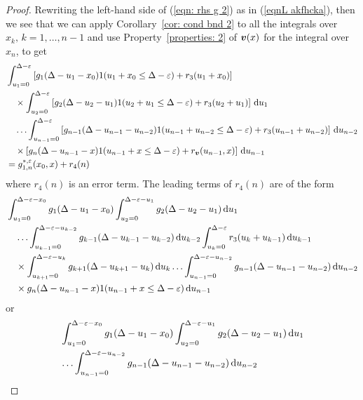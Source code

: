 \begin{proof}
	Rewriting the left-hand side of (\ref{eqn: rhs g 2}) as in (\ref{eqnL akfhcka}), then we see that we can apply Corollary~\ref{cor: cond bnd 2} to all the integrals over \(x_k,\, k=1,\dots,n-1\) and use Property~\ref{properties: 2} of \({\boldsymbol v}(x)\) for the integral over \(x_n\), to get  
	\begin{align*}
		& \int_{u_1=0}^{\Delta-\varepsilon}\left[g_1(\Delta - u_1 - x_0)1(u_1 + x_0\leq \Delta - \varepsilon) + r_3 (u_1 + x_0)\right]
		\\&\quad\times\int_{u_2=0}^{\Delta-\varepsilon}\left[g_2(\Delta - u_2 - u_1)1(u_2 + u_1\leq \Delta - \varepsilon) + r_3 (u_2 + u_1)\right]\, \mathrm{d} u_1
		\\&\quad\hdots 
            	 \int_{u_{n-1}=0}^{\Delta-\varepsilon}  \left[g_{n-1}(\Delta - u_{n-1} - u_{n-2}) 1(u_{n-1} + u_{n-2}\leq \Delta - \varepsilon) +   r_3 (u_{n-1} + u_{n-2})\right] \, \mathrm{d} u_{n-2}
            	\\&\quad\times\left[g_{n}(\Delta-u_{n-1}-x)1(u_{n-1}+x\leq \Delta - \varepsilon) + r_{\boldsymbol v} (u_{n-1},x)\right]\, \mathrm{d} u_{n-1}
		\\&=g^{*,\varepsilon}_{1,n}(x_0,x) + r_4(n)
	\end{align*}
	where \(r_4(n)\) is an error term. The leading terms of \(r_4(n)\) are of the form 
	\begin{align}
		&\int_{u_1=0}^{\Delta-\varepsilon-x_0}g_1(\Delta - u_1 - x_0)
		\int_{u_2=0}^{\Delta-\varepsilon-u_1}g_2(\Delta - u_2 - u_1)\, \mathrm{d} u_1 \nonumber 
		\\&\quad\hdots\int_{u_{k-1}=0}^{\Delta-\varepsilon-u_{k-2}}g_{k-1}(\Delta - u_{k-1} - u_{k-2}) \, \mathrm{d} u_{k-2}
		\int_{u_k=0}^{\Delta-\varepsilon}r_3(u_{k}+u_{k-1}) \, \mathrm{d} u_{k-1} \nonumber 
		\\&\quad\times\int_{u_{k+1}=0}^{\Delta-\varepsilon-u_{k}}g_{k+1}(\Delta - u_{k+1} - u_{k}) \, \mathrm{d} u_{k}
		\hdots
            	\int_{u_{n-1}=0}^{\Delta-\varepsilon-u_{n-2}} g_{n-1}(\Delta - u_{n-1} - u_{n-2}) \, \mathrm{d} u_{n-2} \nonumber 
            	\\&\quad\times g_{n}(\Delta-u_{n-1}-x)1(u_{n-1}+x\leq \Delta -\varepsilon)\, \mathrm{d} u_{n-1} \label{eqn: akfj111112}
	\end{align}
	or
	\begin{align}
		&\int_{u_1=0}^{\Delta-\varepsilon-x_0}g_1(\Delta - u_1 - x_0)
		\int_{u_2=0}^{\Delta-\varepsilon-u_1}g_2(\Delta - u_2 - u_1)\wrt u_1 \nonumber 
		\\&{}\hdots
            	\int_{u_{n-1}=0}^{\Delta-\varepsilon-u_{n-2}} g_{n-1}(\Delta - u_{n-1} - u_{n-2}) \wrt u_{n-2}

\end{align}
\end{proof}
